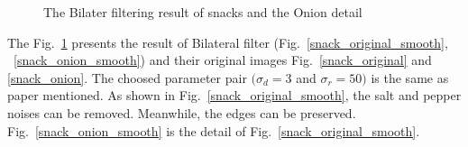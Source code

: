 \documentclass[12pt]{article}
\begin{document}
\begin{figure}[H]
  \centering
  \quad
  \quad
  \quad
  \caption{The Bilater filtering result of snacks and the Onion detail}
  \label{snack}
\end{figure}


The Fig.~\ref{snack} presents the result of Bilateral filter (Fig.~\ref{snack_original_smooth}, ~\ref{snack_onion_smooth}) and their original images Fig.~\ref{snack_original} and \ref{snack_onion}.
The choosed parameter pair $(\sigma_d = 3$ and $\sigma_r = 50)$ is the same as paper mentioned.
As shown in Fig.~\ref{snack_original_smooth}, the salt and pepper noises can be removed.
Meanwhile, the edges can be preserved.
Fig.~\ref{snack_onion_smooth} is the detail of Fig.~\ref{snack_original_smooth}.
\end{document}
